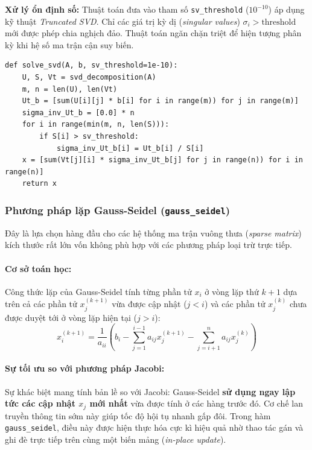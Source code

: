 \documentclass[a4paper,12pt]{article}
\begin{document}
\textbf{Xử lý ổn định số:} Thuật toán đưa vào tham số \texttt{sv\_threshold} ($10^{-10}$) áp dụng kỹ thuật \textit{Truncated SVD}. Chỉ các giá trị kỳ dị (\textit{singular values}) $\sigma_i > \text{threshold}$ mới được phép chia nghịch đảo. Thuật toán ngăn chặn triệt để hiện tượng phân kỳ khi hệ số ma trận cận suy biến.

\begin{lstlisting}[caption={Giai bang SVD Pseudoinverse}]
def solve_svd(A, b, sv_threshold=1e-10):
    U, S, Vt = svd_decomposition(A)
    m, n = len(U), len(Vt)
    Ut_b = [sum(U[i][j] * b[i] for i in range(m)) for j in range(m)]
    sigma_inv_Ut_b = [0.0] * n
    for i in range(min(m, n, len(S))):
        if S[i] > sv_threshold:
            sigma_inv_Ut_b[i] = Ut_b[i] / S[i]
    x = [sum(Vt[j][i] * sigma_inv_Ut_b[j] for j in range(n)) for i in range(n)]
    return x
\end{lstlisting}

\subsubsection{Phương pháp lặp Gauss-Seidel (\texttt{gauss\_seidel})}
Đây là lựa chọn hàng đầu cho các hệ thống ma trận vuông thưa (\textit{sparse matrix}) kích thước rất lớn vốn không phù hợp với các phương pháp loại trừ trực tiếp.

\paragraph{Cơ sở toán học:} 
Công thức lặp của Gauss-Seidel tính từng phần tử $x_i$ ở vòng lặp thứ $k+1$ dựa trên cả các phần tử $x_j^{(k+1)}$ vừa được cập nhật ($j < i$) và các phần tử $x_j^{(k)}$ chưa được duyệt tới ở vòng lặp hiện tại ($j > i$):
\begin{equation}
    x_i^{(k+1)} = \frac{1}{a_{ii}} \left( b_i - \sum_{j=1}^{i-1} a_{ij} x_j^{(k+1)} - \sum_{j=i+1}^{n} a_{ij} x_j^{(k)} \right)
\end{equation}

\paragraph{Sự tối ưu so với phương pháp Jacobi:}
Sự khác biệt mang tính bản lề so với Jacobi: Gauss-Seidel \textbf{sử dụng ngay lập tức các cập nhật $x_j$ mới nhất} vừa được tính ở các hàng trước đó. Cơ chế lan truyền thông tin sớm này giúp tốc độ hội tụ nhanh gấp đôi. Trong hàm \texttt{gauss\_seidel}, điều này được hiện thực hóa cực kì hiệu quả nhờ thao tác gán và ghi đè trực tiếp trên cùng một biến mảng (\textit{in-place update}).
\end{document}
